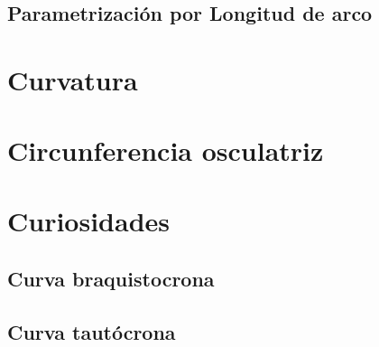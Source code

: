\documentclass{article}
\begin{document}
$$
\subsection{Parametrización por Longitud de arco}

\section{Curvatura}

\section{Circunferencia osculatriz}

\section{Curiosidades}
\subsection{Curva braquistocrona}
\subsection{Curva tautócrona}
\end{document}
